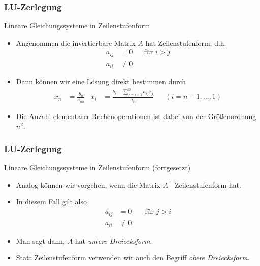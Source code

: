 \documentclass{beamer}
\renewcommand{\emph}[1]{{\textcolor{solarizedRed}{\itshape #1}}}
\newcommand{\trans}{\top}
\renewcommand{\oe}{\"o}
\newcommand{\ue}{\"u}
\newcommand{\mytitle}{LU-Zerlegung}
\begin{document}
\begin{frame}\frametitle{\mytitle}
	\begin{block}{Lineare Gleichungssysteme in Zeilenstufenform}
		\begin{itemize}
			\item Angenommen die invertierbare Matrix $A$ hat Zeilenstufenform, d.h.\
				\begin{align*}
					a_{ij}&=0&&\mbox{f\ue r }i>j\\
					a_{ii}&\neq0
				\end{align*}
			\item Dann k\oe nnen wir eine L\oe sung direkt bestimmen durch
				\begin{align*}
					x_n&=\frac{b_n}{a_{nn}}&
					x_i&=\frac{b_i-\sum_{j=i+1}^na_{ij}x_j}{a_{ii}}&&(i=n-1,\ldots,1)
				\end{align*}
			\item Die Anzahl elementarer Rechenoperationen ist dabei von der Gr\oe\ss enordnung $n^2$.
		\end{itemize}
	\end{block}
\end{frame}

\begin{frame}\frametitle{\mytitle}
	\begin{block}{Lineare Gleichungssysteme in Zeilenstufenform (fortgesetzt)}
		\begin{itemize}
			\item Analog k\oe nnen wir vorgehen, wenn die Matrix $A^\trans$ Zeilenstufenform hat.
			\item In diesem Fall gilt also
				\begin{align*}
					a_{ij}&=0&&\mbox{f\ue r }j>i\\
					a_{ii}&\neq0.
				\end{align*}
			\item Man sagt dann, $A$ hat \emph{untere Dreiecksform}.
			\item Statt Zeilenstufenform verwenden wir auch den Begriff \emph{obere Dreiecksform}.
		\end{itemize}
	\end{block}
\end{frame}
\end{document}

